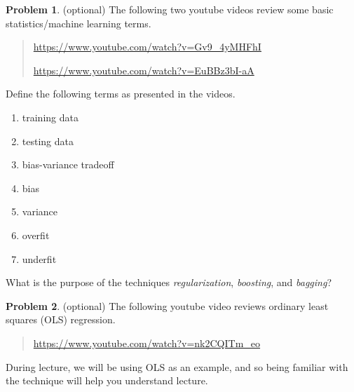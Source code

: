 \documentclass[10pt]{article}
\theoremstyle{definition}
\newtheorem{problem}{Problem}
\begin{document}
\begin{problem}
    (optional)
    The following two youtube videos review some basic statistics/machine learning terms.
    \begin{quote}
    \url{https://www.youtube.com/watch?v=Gv9_4yMHFhI}

    \url{https://www.youtube.com/watch?v=EuBBz3bI-aA}
    \end{quote}
    Define the following terms as presented in the videos.
    \begin{enumerate}
        \item training data
            \vspace{1.5in}
        \item testing data
            \vspace{1in}
        \item bias-variance tradeoff
            \vspace{1in}
        \item bias
            \vspace{1in}
        \item variance
            \vspace{1in}
        \item overfit
            \vspace{1in}
        \item underfit
            \vspace{1in}
    \end{enumerate}
    What is the purpose of the techniques \emph{regularization}, \emph{boosting}, and \emph{bagging}?
    \vspace{1in}
\end{problem}

\newpage
\begin{problem}
    (optional)
    The following youtube video reviews ordinary least squares (OLS) regression.
    \begin{quote}
        \url{https://www.youtube.com/watch?v=nk2CQITm_eo}
    \end{quote}
    During lecture, we will be using OLS as an example,
    and so being familiar with the technique will help you understand lecture.
\end{problem}
\end{document}
